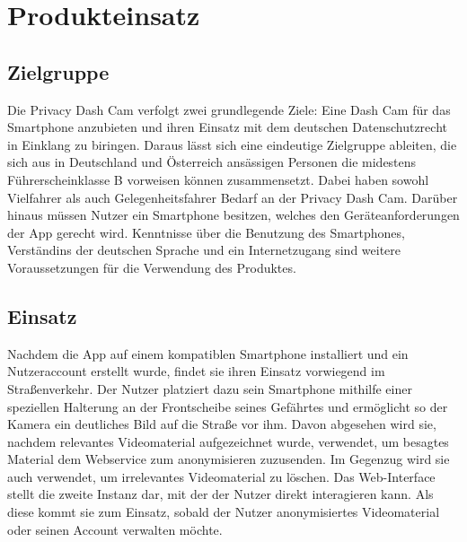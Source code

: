 \chapter{Produkteinsatz}

\section{Zielgruppe}
Die Privacy Dash Cam verfolgt zwei grundlegende Ziele: Eine Dash Cam für das Smartphone anzubieten und ihren Einsatz mit dem deutschen Datenschutzrecht in Einklang zu biringen. Daraus lässt sich eine eindeutige Zielgruppe ableiten, die sich aus in Deutschland und Österreich ansässigen Personen die midestens  Führerscheinklasse B vorweisen können zusammensetzt. Dabei haben sowohl Vielfahrer als auch Gelegenheitsfahrer Bedarf an der Privacy Dash Cam. Darüber hinaus müssen Nutzer ein Smartphone besitzen, welches den Geräteanforderungen der App gerecht wird. Kenntnisse über die Benutzung des Smartphones, Verständins der deutschen Sprache und ein Internetzugang sind weitere Voraussetzungen für die Verwendung des Produktes.

\section{Einsatz}
Nachdem die App auf einem kompatiblen Smartphone installiert und ein Nutzeraccount erstellt wurde, findet sie ihren Einsatz vorwiegend im Straßenverkehr. Der Nutzer platziert dazu sein Smartphone mithilfe einer speziellen Halterung an der Frontscheibe seines Gefährtes und ermöglicht so der Kamera ein deutliches Bild  auf die Straße vor ihm. Davon abgesehen wird sie, nachdem relevantes Videomaterial aufgezeichnet wurde, verwendet, um besagtes Material dem Webservice zum anonymisieren zuzusenden. Im Gegenzug wird sie auch verwendet, um irrelevantes Videomaterial zu löschen.\newline
Das Web-Interface stellt die zweite Instanz dar, mit der der Nutzer direkt interagieren kann. Als diese kommt sie zum Einsatz, sobald der Nutzer anonymisiertes Videomaterial oder seinen Account verwalten möchte.

